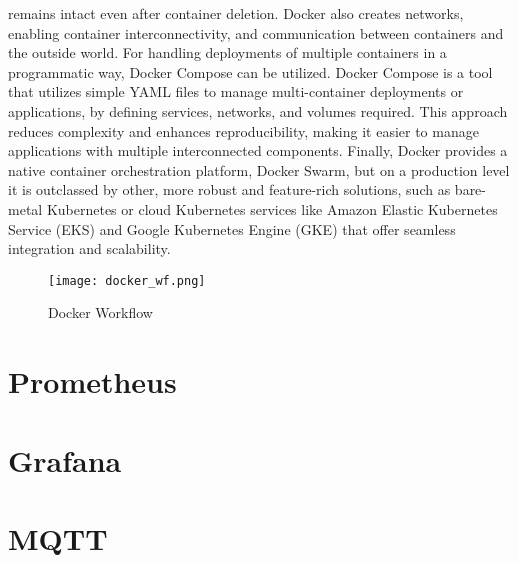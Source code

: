 remains intact even after container deletion. Docker also creates networks, enabling container interconnectivity, and  communication between containers and the outside world. For handling deployments of multiple containers in a programmatic way, Docker Compose can be utilized. Docker Compose is a tool that utilizes simple YAML files to manage multi-container deployments or applications, by defining services, networks, and volumes required. This approach reduces complexity and enhances reproducibility, making it easier to manage applications with multiple interconnected components. Finally, Docker provides a native container orchestration platform, Docker Swarm, but on a production level it is outclassed by other, more robust and feature-rich solutions, such as bare-metal Kubernetes or cloud Kubernetes services like Amazon Elastic Kubernetes Service (EKS) and Google Kubernetes Engine (GKE) that offer seamless integration and scalability.\cite{containers_docker}


\begin{figure}[!h]
    \graphicspath{ {./diagrams/} }
    \texttt{[image: docker\_wf.png]}
    \centering
    \caption{Docker Workflow}
    \label{fig:docker_wf}
\end{figure}

\section{Prometheus}

\section{Grafana}

\section{MQTT}